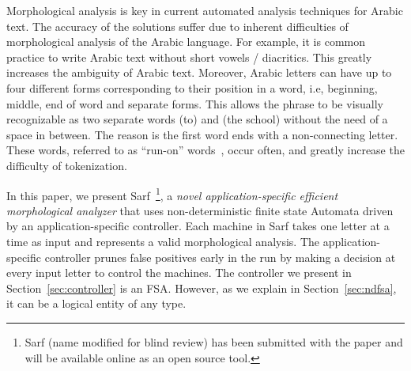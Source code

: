 \documentclass[11pt]{article}
\begin{document}
Morphological analysis is key in current automated 
analysis techniques for Arabic text. 
%
The accuracy of the solutions suffer due to inherent difficulties
of morphological analysis of the Arabic language. 
For example, it is common practice to write Arabic text
without short vowels / diacritics. 
This greatly increases the ambiguity of Arabic text.
Moreover, Arabic letters can have up to 
four different forms
corresponding to their position in a word, i.e, beginning,
middle, end of word and separate forms. 
This allows the phrase \transfalse
{} \transtrue
to be visually recognizable
as two separate words  (to) and  (the school) 
without the need of a space in between. 
The reason is the first word  ends with
 a non-connecting letter. 
These words,
referred to as ``run-on'' words~\cite{Buckwalter:04},
occur often, and greatly increase the
difficulty of tokenization.

In this paper, we present Sarf~\footnote{Sarf (name modified for blind review) 
has been submitted with the paper and will be available online as an open source tool.},
 a {\em novel application-specific efficient
morphological analyzer} that uses 
non-deterministic finite state Automata 
driven by an application-specific controller.
Each machine in Sarf takes one letter at a time as input
and represents a valid morphological analysis.
The application-specific controller prunes false positives
early in the run by making a decision at every input letter
to control the machines.
The controller we present in Section~\ref{sec:controller}
is an FSA. However, as we explain in Section~\ref{sec:ndfsa},
it can be a logical entity of any type. 
\end{document}
